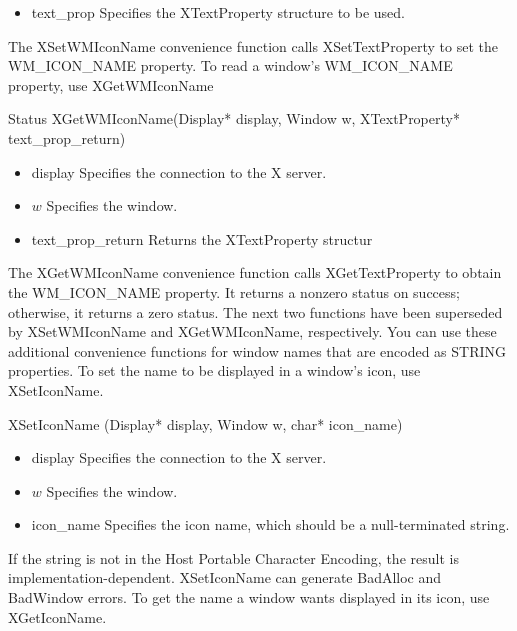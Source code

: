 \documentclass{report}
\begin{document}
\begin{itemize}
\begin{itemize}
\begin{itemize}
                \item text\_prop Specifies the XTextProperty structure to be used.
            \end{itemize}
            The XSetWMIconName convenience function calls XSetTextProperty to set the WM\_ICON\_NAME property.
            \bigbreak \noindent 
            To read a window’s WM\_ICON\_NAME property, use XGetWMIconName
            \bigbreak \noindent 
            \begin{cppcode}
                Status XGetWMIconName(Display* display, Window w, XTextProperty* text_prop_return)
            \end{cppcode}
            \begin{itemize}
                \item display Specifies the connection to the X server.
                \item $w$ Specifies the window.
                \item text\_prop\_return Returns the XTextProperty structur
            \end{itemize}
            The XGetWMIconName convenience function calls XGetTextProperty to obtain the WM\_ICON\_NAME property. It returns a nonzero status on success; otherwise, it returns a zero status.
            \bigbreak \noindent 
            The next two functions have been superseded by XSetWMIconName and XGetWMIconName, respectively. You can use these additional convenience functions for window names that are encoded as STRING properties.
            \bigbreak \noindent 
            To set the name to be displayed in a window’s icon, use XSetIconName.
            \bigbreak \noindent 
            \begin{cppcode}
            XSetIconName (Display* display, Window w, char* icon_name)
            \end{cppcode}
            \begin{itemize}
                \item display Specifies the connection to the X server.
                \item $w$ Specifies the window.
                \item icon\_name Specifies the icon name, which should be a null-terminated string.
            \end{itemize}
            If the string is not in the Host Portable Character Encoding, the result is implementation-dependent. XSetIconName can generate BadAlloc and BadWindow errors.
            \bigbreak \noindent 
            To get the name a window wants displayed in its icon, use XGetIconName.

\end{itemize}
\end{itemize}
\end{document}
